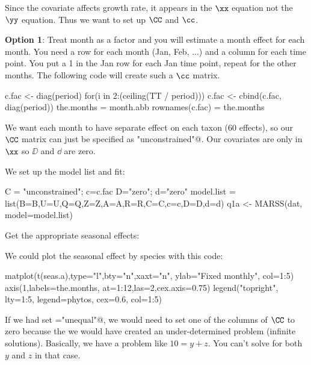 \bigskip
Since the covariate affects growth rate, it appears in the $\xx$ equation not the $\yy$ equation.  Thus we want to set up $\CC$ and $\cc$.

\smallskip
{\bf Option 1}:  Treat month as a factor and you will estimate a month effect for each month. You need a row for each month (Jan, Feb, ...) and a column for each time point. You put a 1 in the Jan row for each Jan time point, repeat for the other months. The following code will create such a $\cc$ matrix.
\begin{Schunk}
\begin{Sinput}
 c.fac <- diag(period)
 for(i in 2:(ceiling(TT / period))) { c.fac <- cbind(c.fac, diag(period)) }
 the.months = month.abb 
 rownames(c.fac) = the.months
\end{Sinput}
\end{Schunk}
We want each month to have separate effect on each taxon (60 effects), so our $\CC$ matrix can just be specified as \verb@"unconstrained"@. Our covariates are only in $\xx$ so $\DD$ and $\dd$ are zero.

We set up the model list and fit: 
\begin{Schunk}
\begin{Sinput}
 C = "unconstrained"; c=c.fac
 D="zero"; d="zero"
 model.list = list(B=B,U=U,Q=Q,Z=Z,A=A,R=R,C=C,c=c,D=D,d=d)
 q1a <- MARSS(dat, model=model.list)
\end{Sinput}
\end{Schunk}
Get the appropriate seasonal effects:
\begin{Schunk}
\end{Schunk}

We could plot the seasonal effect by species with this code:
\begin{Schunk}
\begin{Sinput}
 matplot(t(seas.a),type="l",bty="n",xaxt="n", ylab="Fixed monthly", col=1:5)
 axis(1,labels=the.months, at=1:12,las=2,cex.axis=0.75)
 legend("topright", lty=1:5, legend=phytos, cex=0.6, col=1:5)
\end{Sinput}
\end{Schunk}

If we had set \verb@U="unequal"@, we would need to set one of the columns of $\CC$
to zero because the we would have created an under-determined problem (infinite solutions).  Basically, we have a problem like $10=y+z$.  You can't solve for both $y$ and $z$ in that case.

